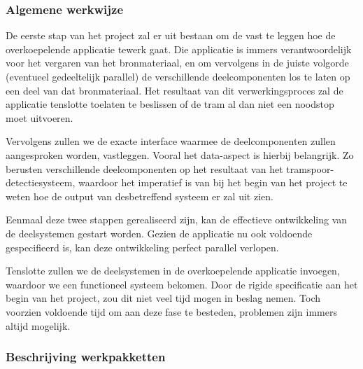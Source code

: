 \documentclass[a4paper,oneside,11pt,final]{memoir}
\begin{document}
\subsubsection{Algemene werkwijze}


De eerste stap van het project zal er uit bestaan om de vast te leggen hoe de overkoepelende applicatie tewerk gaat. Die applicatie is immers verantwoordelijk voor het vergaren van het bronmateriaal, en om vervolgens in de juiste volgorde (eventueel gedeeltelijk parallel) de verschillende deelcomponenten los te laten op een deel van dat bronmateriaal. Het resultaat van dit verwerkingsproces zal de applicatie tenslotte toelaten te beslissen of de tram al dan niet een noodstop moet uitvoeren.

Vervolgens zullen we de exacte interface waarmee de deelcomponenten zullen aangesproken worden, vastleggen. Vooral het data-aspect is hierbij belangrijk. Zo berusten verschillende deelcomponenten op het resultaat van het tramspoor-detectiesysteem, waardoor het imperatief is van bij het begin van het project te weten hoe de output van desbetreffend systeem er zal uit zien.

Eenmaal deze twee stappen gerealiseerd zijn, kan de effectieve ontwikkeling van de deelsystemen gestart worden. Gezien de applicatie nu ook voldoende gespecifieerd is, kan deze ontwikkeling perfect parallel verlopen.

Tenslotte zullen we de deelsystemen in de overkoepelende applicatie invoegen, waardoor we een functioneel systeem bekomen. Door de rigide specificatie aan het begin van het project, zou dit niet veel tijd mogen in beslag nemen. Toch voorzien voldoende tijd om aan deze fase te besteden, problemen zijn immers altijd mogelijk.

\subsubsection{Beschrijving werkpakketten}

\end{document}
